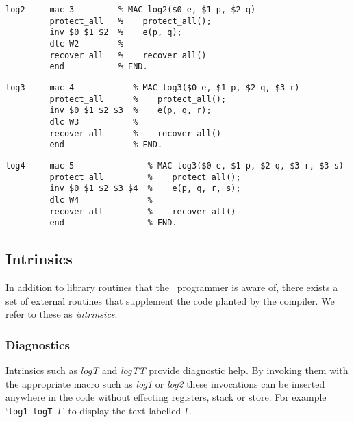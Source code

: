 {\small
\begin{verbatim}
log2     mac 3         % MAC log2($0 e, $1 p, $2 q)
         protect_all   %    protect_all();
         inv $0 $1 $2  %    e(p, q);
         dlc W2        %
         recover_all   %    recover_all()
         end           % END.
\end{verbatim}}

{\small
\begin{verbatim}
log3     mac 4            % MAC log3($0 e, $1 p, $2 q, $3 r)
         protect_all      %    protect_all();
         inv $0 $1 $2 $3  %    e(p, q, r);
         dlc W3           %
         recover_all      %    recover_all()
         end              % END.
\end{verbatim}}

{\small
\begin{verbatim}
log4     mac 5               % MAC log3($0 e, $1 p, $2 q, $3 r, $3 s)
         protect_all         %    protect_all();
         inv $0 $1 $2 $3 $4  %    e(p, q, r, s);
         dlc W4              %
         recover_all         %    recover_all()
         end                 % END.
\end{verbatim}}



\subsection{Intrinsics}\label{intrinsics}
In addition to library routines that the \desi\ programmer is aware of, there exists a set of external routines that supplement the code planted by the compiler. We refer to these as \emph{intrinsics}.



\subsubsection{Diagnostics}\label{diagnostics}
Intrinsics such as \emph{logT} and \emph{logTT} provide diagnostic help.
By invoking them with the appropriate macro such as \emph{log1} or \emph{log2} these invocations can be inserted anywhere in the code without effecting registers, stack or store. For example `\texttt{log1~logT~\emph{t}}' to display the text labelled \texttt{\emph{t}}.

